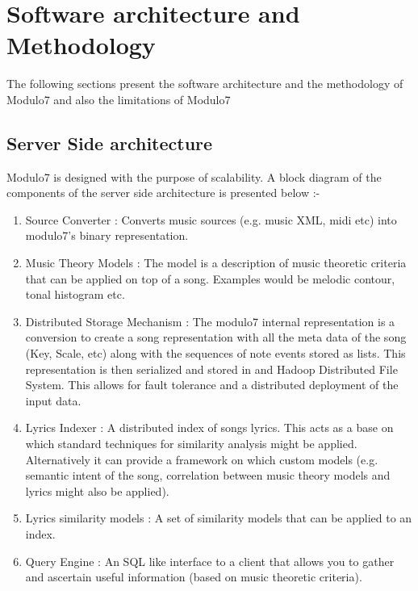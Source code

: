 \chapter{Software architecture and Methodology}
The following sections present the software architecture and the methodology of Modulo7 and also the limitations of Modulo7
\section{Server Side architecture}
\noindent Modulo7 is designed with the purpose of scalability. A block diagram of the components of the server side architecture is presented below :-
\begin{enumerate}
\item Source Converter : Converts music sources (e.g. music XML, midi etc) into modulo7's binary representation.
\item Music Theory Models : The model is a description of music theoretic criteria that can be applied on top of a song. Examples would be melodic contour, tonal histogram etc. 
\item Distributed Storage Mechanism : The modulo7 internal representation is a conversion to create a song representation with all the meta data of the song (Key, Scale,  etc) along with the sequences of note events stored as lists. This representation is then serialized and stored in and Hadoop Distributed File System. This allows for fault tolerance and a distributed deployment of the input data.
\item Lyrics Indexer : A distributed index of songs lyrics. This acts as a base on which standard techniques for similarity analysis might be applied. Alternatively it can provide a framework on which custom models (e.g. semantic intent of the song, correlation between music theory models and lyrics might also be applied).
\item Lyrics similarity models : A set of similarity models that can be applied to an index. 
\item Query Engine : An SQL like interface to a client that allows you to gather and ascertain useful information (based on music theoretic criteria). 
\end{enumerate}

